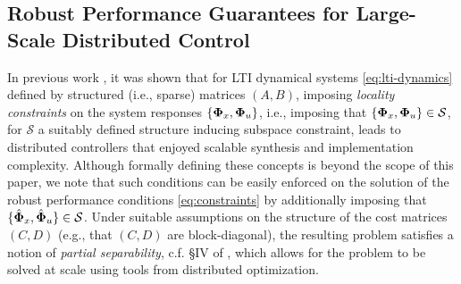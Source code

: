 
\subsection{Robust Performance Guarantees for Large-Scale Distributed Control}
\label{sec:extensions}
In previous work \cite{wang2014localized,wang2016localized,wang2018separable}, it was shown that for LTI dynamical systems \eqref{eq:lti-dynamics} defined by structured (i.e., sparse) matrices $(A,B)$, imposing \emph{locality constraints} on the system responses $\{\boldsymbol{\Phi}_x,\boldsymbol{\Phi}_u\}$, i.e., imposing that $\{\boldsymbol{\Phi}_x,\boldsymbol{\Phi}_u\} \in \mathcal{S}$, for $\mathcal{S}$ a suitably defined structure inducing subspace constraint, leads to distributed controllers that enjoyed scalable synthesis and implementation complexity.  Although formally defining these concepts is beyond the scope of this paper, we note that such conditions can be easily enforced on the solution of the robust performance conditions \eqref{eq:constraints} by additionally imposing that $\{\hat{\boldsymbol{\Phi}}_x,\hat{\boldsymbol{\Phi}}_u\}\in\mathcal{S}$.   Under suitable assumptions on the structure of the cost matrices $(C,D)$ (e.g., that $(C,D)$ are block-diagonal), the resulting problem satisfies a notion of \emph{partial separability}, c.f. \S IV of \cite{wang2018separable}, which allows for the problem to be solved at scale using tools from distributed optimization.  

